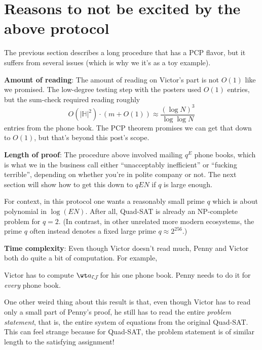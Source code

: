 \documentclass[11pt]{scrreprt}
\begin{document}
\section{Reasons to not be excited by the above protocol}
The previous section describes a long procedure that has a PCP flavor,
but it suffers from several issues (which is why we it's as a toy example).
\begin{itemize}
  \ii \textbf{Amount of reading}:
  The amount of reading on Victor's part is not $O(1)$ like we promised.
  The low-degree testing step with the posters used $O(1)$ entries,
  but the sum-check required reading roughly
  \[ O(|\mathbb H|^2) \cdot (m+O(1)) \approx \frac{(\log N)^3}{\log \log N} \]
  entries from the phone book.
  The PCP theorem promises we can get that down to $O(1)$,
  but that's beyond this post's scope.

  \ii \textbf{Length of proof}:
  The procedure above involved mailing $q^E$ phone books,
  which is what we in the business call either ``unacceptably inefficient''
  or ``fucking terrible'', depending on whether you're in polite company or not.
  The next section will show how to get this down to $qEN$ if $q$ is large enough.

  For context, in this protocol one wants a reasonably small prime $q$
  which is about polynomial in $\log(EN)$.
  After all, Quad-SAT is already an NP-complete problem for $q=2$.
  (In contrast, in other unrelated more modern ecosystems,
  the prime $q$ often instead denotes a fixed large prime $q \approx 2^{256}$.)

  \ii \textbf{Time complexity}:
  Even though Victor doesn't read much,
  Penny and Victor both do quite a bit of computation.
  For example,
  \begin{itemize}
  \ii Victor has to compute $\wt a_{\vec\imath, \vec\jmath}$ for his one phone book.
  \ii Penny needs to do it for \emph{every} phone book.
  \end{itemize}

  \ii One other weird thing about this result is that,
  even though Victor has to read only a small part of Penny's proof,
  he still has to read the entire \emph{problem statement},
  that is, the entire system of equations from the original Quad-SAT.
  This can feel strange because for Quad-SAT,
  the problem statement is of similar length to the satisfying assignment!

\end{itemize}
\end{document}
